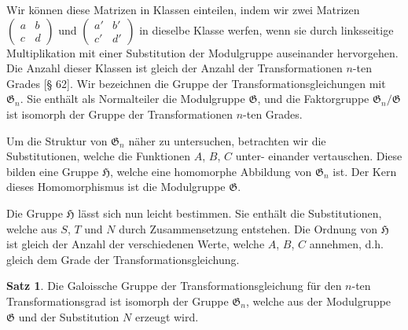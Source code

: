 \documentclass[12pt,a4paper]{article}
\theoremstyle{definition}
\newtheorem*{satz}{Satz}
\begin{document}
Wir k\"onnen diese Matrizen in Klassen einteilen, indem wir
zwei Matrizen $\begin{pmatrix} a & b \\ c & d \end{pmatrix}$ und
$\begin{pmatrix} a' & b' \\ c' & d' \end{pmatrix}$ in dieselbe Klasse
werfen, wenn sie durch linksseitige Multiplikation mit einer
Substitution der Modulgruppe auseinander hervorgehen. Die
Anzahl dieser Klassen ist gleich der Anzahl der Transformationen
$n$-ten Grades [\S{} 62].
Wir bezeichnen die Gruppe der Transformationsgleichungen
mit $\mathfrak{G}_n$. Sie enth\"alt als Normalteiler die Modulgruppe
$\mathfrak{G}$, und die Faktorgruppe $\mathfrak{G}_n/\mathfrak{G}$ ist isomorph der
Gruppe der Transformationen $n$-ten Grades.

Um die Struktur von $\mathfrak{G}_n$ n\"aher zu untersuchen, betrachten
wir die Substitutionen, welche die Funktionen $A$, $B$, $C$ unter-
einander vertauschen. Diese bilden eine Gruppe $\mathfrak{H}$, welche
eine homomorphe Abbildung von $\mathfrak{G}_n$ ist. Der Kern dieses
Homomorphismus ist die Modulgruppe $\mathfrak{G}$.

Die Gruppe $\mathfrak{H}$ l\"asst sich nun leicht bestimmen. Sie
enth\"alt die Substitutionen, welche aus $S$, $T$ und $N$ durch
Zusammensetzung entstehen. Die Ordnung von $\mathfrak{H}$ ist gleich
der Anzahl der verschiedenen Werte, welche $A$, $B$, $C$ annehmen,
d.h. gleich dem Grade der Transformationsgleichung.

\begin{satz}
Die Galoissche Gruppe der Transformationsgleichung f\"ur den
$n$-ten Transformationsgrad ist isomorph der Gruppe $\mathfrak{G}_n$,
welche aus der Modulgruppe $\mathfrak{G}$ und der Substitution $N$
erzeugt wird.
\end{satz}
\end{document}
